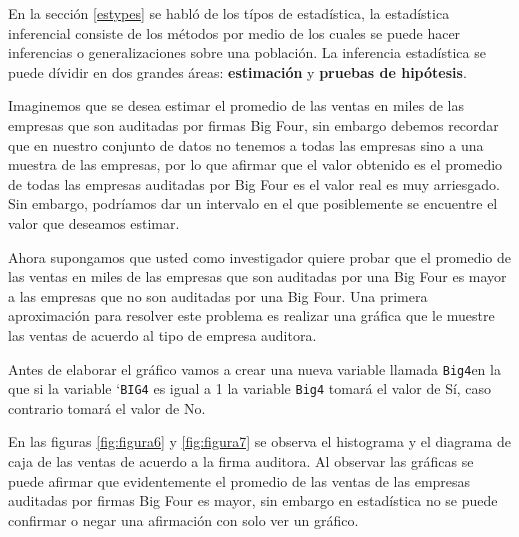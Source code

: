 \documentclass[]{book}
\newenvironment{Shaded}{\begin{snugshade}}{\end{snugshade}}
\newcommand{\KeywordTok}[1]{\textcolor[rgb]{0.13,0.29,0.53}{\textbf{#1}}}
\newcommand{\DataTypeTok}[1]{\textcolor[rgb]{0.13,0.29,0.53}{#1}}
\newcommand{\DecValTok}[1]{\textcolor[rgb]{0.00,0.00,0.81}{#1}}
\newcommand{\StringTok}[1]{\textcolor[rgb]{0.31,0.60,0.02}{#1}}
\newcommand{\OperatorTok}[1]{\textcolor[rgb]{0.81,0.36,0.00}{\textbf{#1}}}
\newcommand{\NormalTok}[1]{#1}
\begin{document}
En la sección \ref{estypes} se habló de los típos de estadística, la
estadística inferencial consiste de los métodos por medio de los cuales
se puede hacer inferencias o generalizaciones sobre una población. La
inferencia estadística se puede dívidir en dos grandes áreas:
\textbf{estimación} y \textbf{pruebas de hipótesis}.

Imaginemos que se desea estimar el promedio de las ventas en miles de
las empresas que son auditadas por firmas Big Four, sin embargo debemos
recordar que en nuestro conjunto de datos no tenemos a todas las
empresas sino a una muestra de las empresas, por lo que afirmar que el
valor obtenido es el promedio de todas las empresas auditadas por Big
Four es el valor real es muy arriesgado. Sin embargo, podríamos dar un
intervalo en el que posiblemente se encuentre el valor que deseamos
estimar.

Ahora supongamos que usted como investigador quiere probar que el
promedio de las ventas en miles de las empresas que son auditadas por
una Big Four es mayor a las empresas que no son auditadas por una Big
Four. Una primera aproximación para resolver este problema es realizar
una gráfica que le muestre las ventas de acuerdo al tipo de empresa
auditora.

Antes de elaborar el gráfico vamos a crear una nueva variable llamada
\texttt{Big4}en la que si la variable `\texttt{BIG4} es igual a 1 la
variable \texttt{Big4} tomará el valor de Sí, caso contrario tomará el
valor de No.

\begin{Shaded}
\end{Shaded}

En las figuras \ref{fig:figura6} y \ref{fig:figura7} se observa el
histograma y el diagrama de caja de las ventas de acuerdo a la firma
auditora. Al observar las gráficas se puede afirmar que evidentemente el
promedio de las ventas de las empresas auditadas por firmas Big Four es
mayor, sin embargo en estadística no se puede confirmar o negar una
afirmación con solo ver un gráfico.
\end{document}

